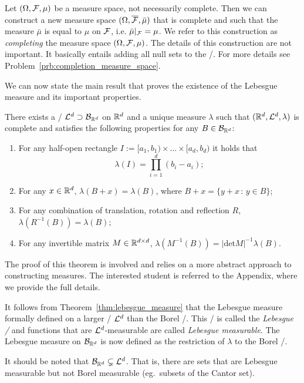 \medskip

Let $(\Omega, \mathcal F, \mu)$ be a measure space, not necessarily complete. Then we can construct a new measure space $(\Omega, \overline{\mathcal F}, \bar{\mu})$ that is complete and such that the measure $\bar{\mu}$ is equal to $\mu$ on $\mathcal F$, i.e. $\bar{\mu}|_{\mathcal F} = \mu$. We refer to this construction as \emph{completing} the measure space $(\Omega, \mathcal F, \mu)$. The details of this construction are not important. It basically entails adding all null sets to the \sigalg/. For more details see Problem~\ref{prb:completion_measure_space}.

We can now state the main result that proves the existence of the Lebesgue measure and its important properties. 

\begin{theorem}\label{thm:lebesgue_measure}
There exists a \sigalg/ $\mathcal L^d \supset \mathcal B_{\mathbb R^d}$ on $\mathbb R^d$ and a unique measure $\lambda$ such that $(\mathbb R^d, \mathcal L^d, \lambda)$ is complete and satisfies the following properties for any $B \in \mathcal B_{\mathbb R^d}$:
\begin{enumerate}
\item For any half-open rectangle $I := [a_1, b_1) \times \dots \times [a_d, b_d)$ it holds that 
	\[
		\lambda(I) = \prod_{i = 1}^d (b_i-a_i);
	\]
\item For any $x \in \mathbb R^d$, $\lambda(B+x) = \lambda(B)$, where $B + x = \{y+x \, : \, y \in B\}$;
\item For any combination of translation, rotation and reflection $R$, $\lambda(R^{-1}(B)) = \lambda(B)$;
\item For any invertible matrix $M \in \mathbb R^{d \times d}$, $\lambda(M^{-1}(B)) = |\mathrm{det} M|^{-1} \lambda(B)$.
\end{enumerate}
\end{theorem}

The proof of this theorem is involved and relies on a more abstract approach to constructing measures. The interested student is referred to the Appendix, where we provide the full details.  

It follows from Theorem~\ref{thm:lebesgue_measure} that the Lebesgue measure formally defined on a larger \sigalg/ $\mathcal L^d$ than the Borel \sigalg/. This \sigalg/ is called the \emph{Lebesgue \sigalg/} and functions that are $\mathcal L^d$-measurable are called \emph{Lebesgue measurable}. The Lebesgue measure on $\mathcal B_{\mathbb R^d}$ is now defined as the restriction of $\lambda$ to the Borel \sigalg/. 

\begin{remark}
It should be noted that $\mathcal B_{\mathbb R^d} \subsetneq \mathcal L^d$. That is, there are sets that are Lebesgue measurable but not Borel measurable (eg.\ subsets of the Cantor set).
\end{remark}


